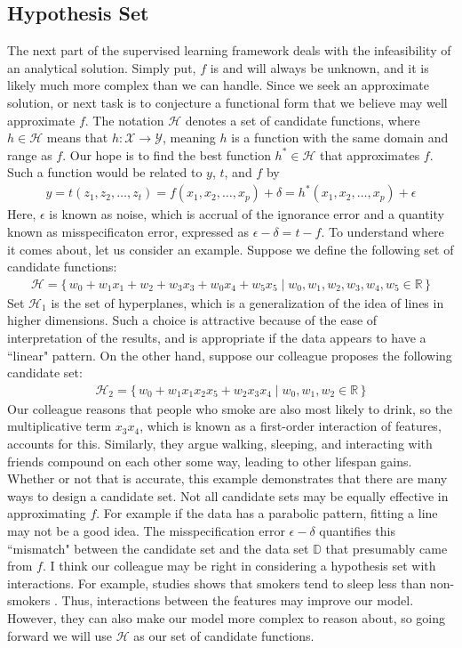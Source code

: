 \documentclass[12pt]{article}
\begin{document}
	\subsection{Hypothesis Set}
	The next part of the supervised learning framework deals with the
	infeasibility of an analytical solution. Simply put, $f$ is and will
	always be unknown, and it is likely much more complex than we can handle.
	Since we seek an approximate solution, or next task is to conjecture a
	functional form that we believe may well approximate $f$. The notation
	$\mathcal{H}$ denotes a set of candidate functions, where $h\in \mathcal{H}$
	means that $h:\mathcal{X}\to\mathcal{Y}$, meaning $h$ is a function with
	the same domain and range as $f$. Our hope is to find the best function
	$h^*\in \mathcal{H}$ that approximates $f$. Such a function would be related
	to $y$, $t$, and $f$ by
	\begin{align*}
		y
		=t(z_1,z_2,\ldots,z_t)
		=f(x_1,x_2,\ldots,x_p) + \delta
		=h^*(x_1,x_2,\ldots,x_p) + \epsilon
	\end{align*}
	Here, $\epsilon$ is known as noise, which is accrual of the ignorance error and
	a quantity known as misspecificaton error, expressed as $\epsilon-\delta = t-f$.
	To understand where it comes about, let us consider an example. Suppose we define the
	following set of
	candidate functions:
	\begin{align*}
		\mathcal{H} = \{\,
		w_0+w_1x_1+w_2+w_3x_3+w_0x_4+w_5x_5 \mid w_0,w_1,w_2,w_3,w_4,w_5\in\mathbb{R}
		\,\}
	\end{align*}
	Set $\mathcal{H}_1$ is the set of hyperplanes, which is a generalization of
	the idea of lines in higher dimensions. Such a choice is attractive because
	of the ease of interpretation of the results, and is appropriate if the
	data appears to have a ``linear" pattern. On the other hand, suppose our
	colleague proposes the following candidate set:
	\begin{align*}
		\mathcal{H}_2 = \{\,
		w_0 + w_1x_1x_2x_5 + w_2x_3x_4 \mid w_0,w_1,w_2\in \mathbb{R}
		\,\}
	\end{align*}
	Our colleague reasons that people who smoke are also most likely to drink,
	so the multiplicative term $x_3x_4$, which is known as a first-order interaction
	of features, accounts for this. Similarly, they argue walking, sleeping,
	and interacting with friends compound on each other some way, leading to
	other lifespan gains. Whether or not that is accurate, this example demonstrates
	that there are many ways to design a candidate set. Not all candidate sets
	may be equally effective in approximating $f$. For example if the data has
	a parabolic pattern, fitting a line may not be a good idea. The misspecification
	error $\epsilon-\delta$ quantifies this ``mismatch" between the candidate set
	and the data set $\mathbb{D}$ that presumably came from $f$. I think our
	colleague may be right in considering a hypothesis set with interactions.
	For example, studies shows that smokers tend to sleep less than non-smokers
	\cite{SciDirect-smoking-sleeping}. Thus, interactions between the features
	may improve our model. However, they can also make our model more complex to
	reason about, so going forward we will use $\mathcal{H}$ as our set
	of candidate functions.
\end{document}
